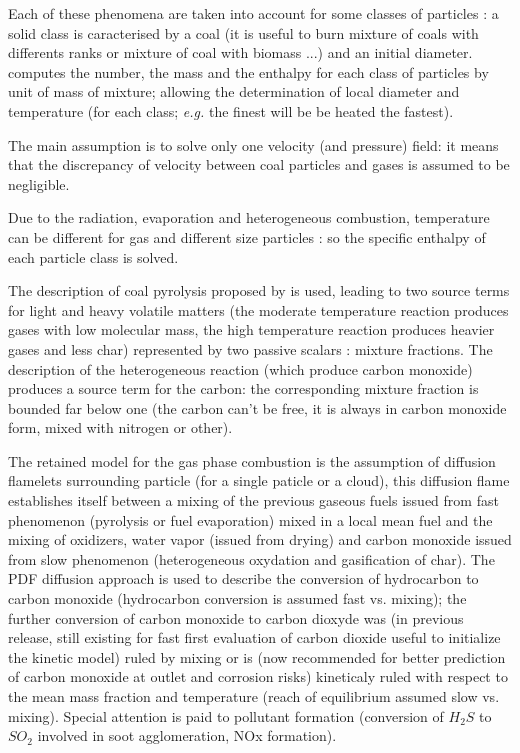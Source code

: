 Each of these phenomena are taken into account for some classes of particles : a
solid class is caracterised by a coal (it is useful to burn mixture of coals
with differents ranks or mixture of coal with biomass ...) and an initial
diameter. \CS~
computes the number, the mass and the enthalpy for each class of particles by
unit of mass of mixture; allowing the determination of local diameter and
temperature (for each class;
\emph{e.g.} the finest will be be heated the fastest).

The main assumption is to solve only one velocity (and pressure) field: it
means that the discrepancy of velocity between coal particles and
gases is assumed to be negligible.

Due to the radiation, evaporation and heterogeneous combustion, temperature can
be different for gas and different size particles : so the specific enthalpy of
each particle class is solved.

The description of coal pyrolysis proposed by \cite{Kobayashi:1976} is used, leading to two
source terms for light and heavy volatile matters (the moderate temperature
reaction produces gases with low molecular mass, the high temperature reaction
produces heavier gases and less char) represented by two passive scalars :
mixture fractions.  The description of the heterogeneous reaction (which produce
carbon monoxide) produces a source term for the carbon: the corresponding
mixture fraction is bounded far below one (the carbon can't be free, it is
always in carbon monoxide form, mixed with nitrogen or other).

The retained model for the gas phase combustion is the assumption of diffusion
flamelets surrounding particle (for a single paticle or a cloud), this
diffusion flame establishes itself between a mixing of the previous gaseous fuels
issued from fast phenomenon (pyrolysis or fuel evaporation) mixed in a local
mean fuel and the mixing of oxidizers, water vapor (issued from drying) and
carbon monoxide issued from slow phenomenon (heterogeneous oxydation and
gasification of char). The PDF diffusion approach is used to describe the
conversion of hydrocarbon to carbon monoxide (hydrocarbon conversion is assumed
fast vs. mixing); the further conversion of carbon monoxide to carbon dioxyde
was (in previous release, still existing for fast first evaluation of carbon
dioxide useful to initialize the kinetic model) ruled by mixing or is (now
recommended for better prediction of carbon monoxide at outlet and corrosion
risks) kineticaly ruled with respect to the mean mass fraction and temperature
(reach of equilibrium assumed slow vs. mixing). Special attention is paid to
pollutant formation (conversion of $H_{2}S$ to $SO_{2}$ involved in soot
agglomeration, NOx formation).

\newpage
